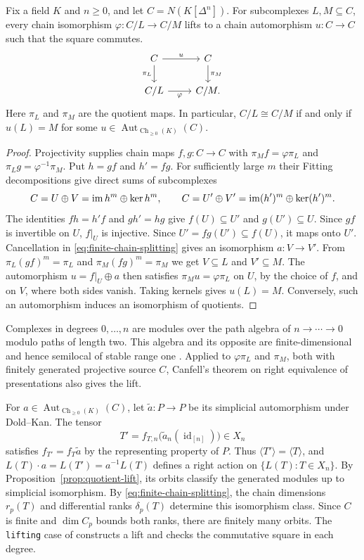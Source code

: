 \begin{proposition}\label{prop:quotient-lift}
Fix a field $K$ and $n\geq0$, and let $C=N(K[\Delta^n])$.
For subcomplexes $L,M\subseteq C$, every chain isomorphism
$\varphi:C/L\to C/M$ lifts to a chain automorphism $u:C\to C$
such that the square commutes.
\[
\begin{tikzcd}
 C \arrow[r,"u"] \arrow[d,"\pi_L"'] & C \arrow[d,"\pi_M"]\\
 C/L \arrow[r,"\varphi"'] & C/M .
\end{tikzcd}
\]
Here $\pi_L$ and $\pi_M$ are the quotient maps. In particular,
$C/L\cong C/M$ if and only if $u(L)=M$ for some
$u\in\operatorname{Aut}_{\operatorname{Ch}_{\geq0}(K)}(C)$.
\end{proposition}
\begin{proof}
Projectivity supplies chain maps $f,g:C\to C$ with
$\pi_Mf=\varphi\pi_L$ and $\pi_Lg=\varphi^{-1}\pi_M$.
Put $h=gf$ and $h'=fg$. For sufficiently large $m$ their Fitting
decompositions give direct sums of subcomplexes
\[
 C=U\oplus V=\operatorname{im} h^m\oplus\ker h^m,\qquad
 C=U'\oplus V'=\operatorname{im} (h')^m\oplus\ker (h')^m.
\]
The identities $fh=h'f$ and $gh'=hg$ give $f(U)\subseteq U'$ and
$g(U')\subseteq U$. Since $gf$ is invertible on $U$, $f|_U$ is
injective. Since $U'=fg(U')\subseteq f(U)$, it maps onto $U'$.
Cancellation in \eqref{eq:finite-chain-splitting} gives
an isomorphism $a:V\to V'$. From $\pi_L(gf)^m=\pi_L$ and
$\pi_M(fg)^m=\pi_M$ we get $V\subseteq L$ and $V'\subseteq M$.
The automorphism $u=f|_U\oplus a$ then satisfies $\pi_Mu=\varphi\pi_L$
on $U$, by the choice of $f$, and on $V$, where both sides vanish.
Taking kernels gives $u(L)=M$.
Conversely, such an automorphism induces an isomorphism of quotients.
\end{proof}

Complexes in degrees $0,\ldots,n$ are modules over the path algebra
of $n\to\cdots\to0$ modulo paths of length two. This algebra and its opposite are
finite-dimensional and hence semilocal of stable range one
\cite[Corollary~6.5]{Bass1964}. Applied to $\varphi\pi_L$ and $\pi_M$,
both with finitely generated projective source $C$, Canfell's theorem on right
equivalence of presentations \cite[p.~141]{Canfell1992} also gives the lift.

For $a\in\operatorname{Aut}_{\operatorname{Ch}_{\geq0}(K)}(C)$,
let $\widetilde a:P\to P$ be its simplicial automorphism under Dold--Kan.
The tensor
\[
 T'=f_{T,n}\bigl(\widetilde a_n(\operatorname{id}_{[n]})\bigr)\in X_n
\]
satisfies $f_{T'}=f_T\widetilde a$ by the representing property of $P$.
Thus $\langle T'\rangle=\langle T\rangle$, and $L(T)\cdot a=L(T')=a^{-1}L(T)$
defines a right action on $\{L(T):T\in X_n\}$. By Proposition~\ref{prop:quotient-lift},
its orbits classify the generated modules up to simplicial isomorphism.
By \eqref{eq:finite-chain-splitting}, the chain dimensions $r_p(T)$ and
differential ranks $\delta_p(T)$ determine this isomorphism class.
Since $C$ is finite and $\dim C_p$ bounds both ranks, there are finitely many orbits.
The \texttt{lifting} case of 
constructs a lift and checks the commutative square in each degree.

